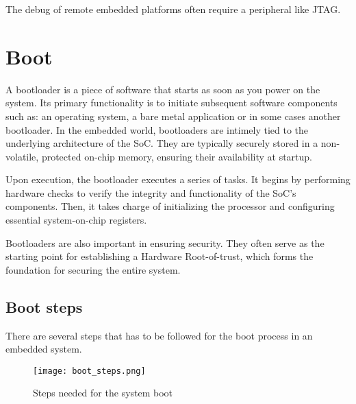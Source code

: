 The debug of remote embedded platforms often require a peripheral like JTAG.

\section{Boot}

A bootloader is a piece of software that starts as soon as you power on the
system.
Its primary functionality is to initiate subsequent software components such
as: an operating system, a bare metal application or in some cases another
bootloader.
In the embedded world, bootloaders are intimely tied to the underlying
architecture of the SoC. They are typically securely stored in a non-volatile,
protected on-chip memory, ensuring their availability at startup.

Upon execution, the bootloader executes a series of tasks. It begins by
performing hardware checks to verify the integrity and functionality of the
SoC's components. Then, it takes charge of initializing the processor and
configuring essential system-on-chip registers.

Bootloaders are also important in ensuring security. They often
serve as the starting point for establishing a Hardware Root-of-trust, which
forms the foundation for securing the entire system.

\subsection{Boot steps}

There are several steps that has to be followed for the boot process in an
embedded system.

\begin{figure}
    \centering
    \texttt{[image: boot\_steps.png]}
    \caption{Steps needed for the system boot}
\end{figure}

